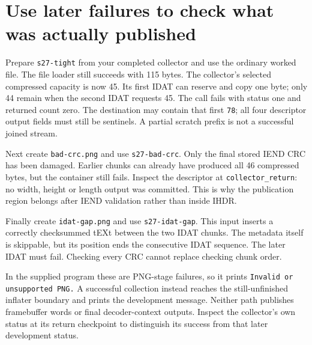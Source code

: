 \section{Use later failures to check what was actually published}
Prepare \texttt{s27-tight} from your completed collector and use the ordinary worked
file. The file loader still succeeds with 115 bytes. The collector's selected compressed
capacity is now 45. Its first IDAT can reserve and copy one byte; only 44 remain when
the second IDAT requests 45. The call fails with status one and returned count zero.
The destination may contain that first \texttt{78}; all four descriptor output fields
must still be sentinels. A partial scratch prefix is not a successful joined stream.

Next create \texttt{bad-crc.png} and use \texttt{s27-bad-crc}. Only the final stored
IEND CRC has been damaged. Earlier chunks can already have produced all 46 compressed
bytes, but the container still fails. Inspect the descriptor at
\texttt{collector\_return}: no width, height or length output was committed. This is
why the publication region belongs after IEND validation rather than inside IHDR.

Finally create \texttt{idat-gap.png} and use \texttt{s27-idat-gap}. This input inserts
a correctly checksummed tEXt between the two IDAT chunks. The metadata itself is
skippable, but its position ends the consecutive IDAT sequence. The later IDAT must
fail. Checking every CRC cannot replace checking chunk order.

In the supplied program these are PNG-stage failures, so it prints
\texttt{Invalid or unsupported PNG.} A successful collection instead reaches the
still-unfinished inflater boundary and prints the development message. Neither path
publishes framebuffer words or final decoder-context outputs. Inspect the collector's
own status at its return checkpoint to distinguish its success from that later
development status.
